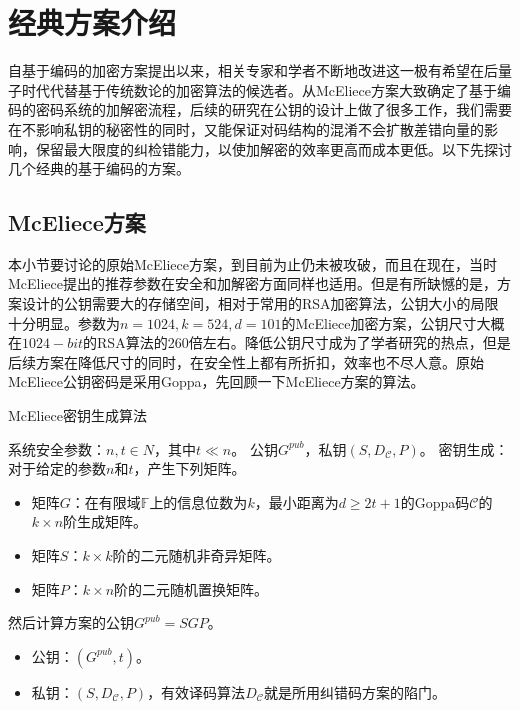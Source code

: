 \chapter{经典方案介绍}
\vspace{-0.2cm}
自基于编码的加密方案提出以来，相关专家和学者不断地改进这一极有希望在后量子时代代替基于传统数论的加密算法的候选者。从McEliece方案大致确定了基于编码的密码系统的加解密流程，后续的研究在公钥的设计上做了很多工作，我们需要在不影响私钥的秘密性的同时，又能保证对码结构的混淆不会扩散差错向量的影响，保留最大限度的纠检错能力，以使加解密的效率更高而成本更低。以下先探讨几个经典的基于编码的方案。
\section{McEliece方案}
本小节要讨论的原始McEliece方案，到目前为止仍未被攻破，而且在现在，当时McEliece提出的推荐参数在安全和加解密方面同样也适用。但是有所缺憾的是，方案设计的公钥需要大的存储空间，相对于常用的RSA加密算法，公钥大小的局限十分明显。参数为$n=1024,k=524,d=101$的McEliece加密方案，公钥尺寸大概在$1024-bit$的RSA算法的260倍左右。降低公钥尺寸成为了学者研究的热点，但是后续方案在降低尺寸的同时，在安全性上都有所折扣，效率也不尽人意。原始McEliece公钥密码是采用Goppa，先回顾一下McEliece方案的算法。

\begin{breakablealgorithm}
	\small
	\renewcommand{\algorithmicrequire}{\textbf{Input:}}
	\renewcommand{\algorithmicensure}{\textbf{Output:}}
	\caption{McEliece密钥生成算法}
	\label{alg:McElieceKeyGen}
	\begin{algorithmic}[1]
		\Require
		系统安全参数：$n,t \in N$，其中$t \ll n$。
		\Ensure
		公钥$G^{pub}$，私钥$(S,D_\mathcal{C},P)$。
		\State
		密钥生成：对于给定的参数$n$和$t$，产生下列矩阵。
		\begin{itemize}
			\item 矩阵$G$：在有限域$\mathbb{F}$上的信息位数为$k$，最小距离为$d \geq 2t + 1$的Goppa码$\mathcal{C}$的$k \times n$阶生成矩阵。
			\item 矩阵$S$：$k \times k$阶的二元随机非奇异矩阵。
			\item 矩阵$P$：$k \times n$阶的二元随机置换矩阵。
		\end{itemize}	    
		\State
		然后计算方案的公钥$G^{pub} = SGP$。
		\begin{itemize}
			\item 公钥：$(G^{pub},t)$。
			\item 私钥：$(S,D_\mathcal{C},P)$，有效译码算法$D_\mathcal{C}$就是所用纠错码方案的陷门。
		\end{itemize}
	\end{algorithmic}
\end{breakablealgorithm}

